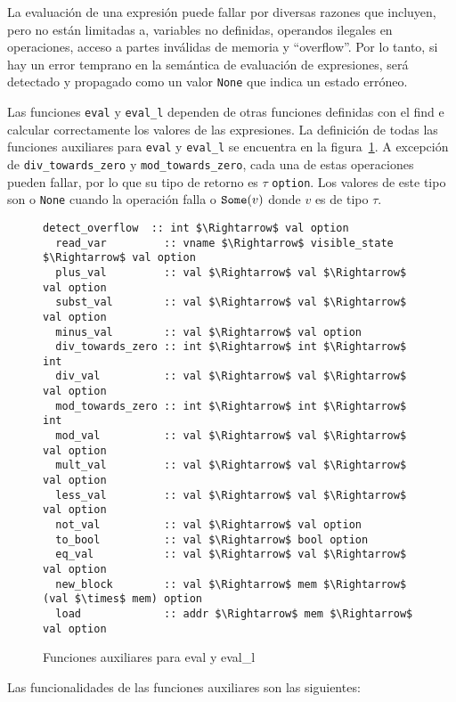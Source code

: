 La evaluación de una expresión puede fallar por diversas razones que incluyen, pero no están limitadas a, variables no definidas, operandos ilegales en operaciones, acceso a partes inválidas de memoria y ``overflow''.
Por lo tanto, si hay un error temprano en la semántica de evaluación de expresiones, será detectado y propagado como un valor \verb|None| que indica un estado erróneo.

Las funciones \verb|eval| y \verb|eval_l| dependen de otras funciones definidas con el find e calcular correctamente los valores de las expresiones.
La definición de todas las funciones auxiliares para \verb|eval| y \verb|eval_l| se encuentra en la figura~\ref{fig:aux_fun_eval}.
A excepción de \verb|div_towards_zero| y \verb|mod_towards_zero|, cada una de estas operaciones pueden fallar, por lo que su tipo de retorno es $\tau$ \verb|option|.
Los valores de este tipo son o \verb|None| cuando la operación falla o $\verb|Some|(v)$ donde $v$ es de tipo $\tau$.

\begin{figure}
  \begin{lstlisting}[mathescape=true, frame=single]
  detect_overflow  :: int $\Rightarrow$ val option
  read_var         :: vname $\Rightarrow$ visible_state $\Rightarrow$ val option
  plus_val         :: val $\Rightarrow$ val $\Rightarrow$ val option
  subst_val        :: val $\Rightarrow$ val $\Rightarrow$ val option
  minus_val        :: val $\Rightarrow$ val option
  div_towards_zero :: int $\Rightarrow$ int $\Rightarrow$ int
  div_val          :: val $\Rightarrow$ val $\Rightarrow$ val option
  mod_towards_zero :: int $\Rightarrow$ int $\Rightarrow$ int
  mod_val          :: val $\Rightarrow$ val $\Rightarrow$ val option
  mult_val         :: val $\Rightarrow$ val $\Rightarrow$ val option
  less_val         :: val $\Rightarrow$ val $\Rightarrow$ val option
  not_val          :: val $\Rightarrow$ val option
  to_bool          :: val $\Rightarrow$ bool option
  eq_val           :: val $\Rightarrow$ val $\Rightarrow$ val option
  new_block        :: val $\Rightarrow$ mem $\Rightarrow$ (val $\times$ mem) option
  load             :: addr $\Rightarrow$ mem $\Rightarrow$ val option
  \end{lstlisting}

  \caption{Funciones auxiliares para eval y eval\_l}
  \label{fig:aux_fun_eval}
\end{figure}

Las funcionalidades de las funciones auxiliares son las siguientes:

